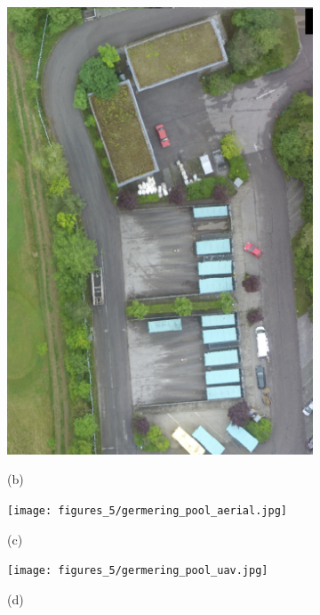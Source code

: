 \begin{figure}[tbp]
\begin{subfigure}[tbp]{0.24\columnwidth}
           \includegraphics[width=\textwidth]{figures_5/germering_ortho_uav.jpg}           
           {{\small }}    
           \centerline{\small{(b)}}\medskip
       \end{subfigure}
       \hfill
       \begin{subfigure}[tbp]{0.243\columnwidth}
           \centering
           \texttt{[image: figures\_5/germering\_pool\_aerial.jpg]}
           {{\small }}    
           \centerline{\small{(c)}}\medskip
       \end{subfigure}
        \hfill
       \begin{subfigure}[tbp]{0.243\columnwidth}
           \centering
           \texttt{[image: figures\_5/germering\_pool\_uav.jpg]}
           {{\small }}    
           \centerline{\small{(d)}}\medskip
       \end{subfigure}

\end{figure}
